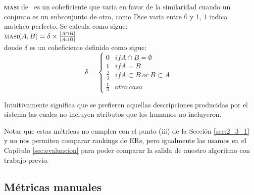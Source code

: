 \textbf{\textsc{masi}} de \cite{masi}~es un coheficiente que var\'ia en favor de la similaridad cuando un conjunto es un subconjunto de otro, como Dice varia entre 0 y 1, 1 indica matcheo perfecto. Se calcula como sigue:\\

$\textsc{masi}(A,B) = \delta \times \frac{|A \cap B|}{|A \cup B|}$ \\


donde $\delta$ es un coheficiente definido como sigue:\\


 \begin{equation}
     \delta  = \left\{
	       \begin{array}{ll}
		 0      & if A \cap B = \emptyset \\
		 1 & if A = B  \\
		 \frac{2}{3}     & if A \subset B ~or~ B \subset A\\
		 \frac{1}{3}     & otro ~caso
	       \end{array}
	     \right.
 \end{equation}

Intuitivamente significa que se prefieren aquellas descripciones producidas por el sistema las cuales no incluyen atributos que los humanos no incluyeron.

Notar que estas m\'etricas no cumplen con el punto (iii) de la Secci\'on \ref{sec:2_3_1} y no nos permiten comparar rankings de ERs, pero igualmente las usamos en el Cap\'itulo \ref{sec:evaluacion} para poder comparar la salida de nuestro algoritmo con trabajo previo.

\subsection{M\'etricas manuales}

